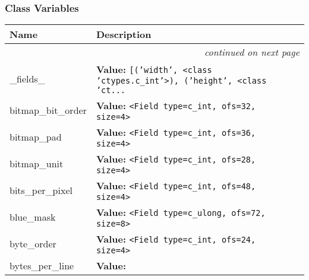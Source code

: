 
  \subsubsection{Class Variables}

    \vspace{-1cm}
\hspace{\varindent}\begin{longtable}{|p{\varnamewidth}|p{\vardescrwidth}|l}
\cline{1-2}
\cline{1-2} \centering \textbf{Name} & \centering \textbf{Description}& \\
\cline{1-2}
\endhead\cline{1-2}\multicolumn{3}{r}{\small\textit{continued on next page}}\\\endfoot\cline{1-2}
\endlastfoot\raggedright \_\-f\-i\-e\-l\-d\-s\-\_\- & \raggedright \textbf{Value:} 
{\tt \texttt{[}\texttt{(}\texttt{'}\texttt{width}\texttt{'}\texttt{, }{\textless}class 'ctypes.c\_int'{\textgreater}\texttt{)}\texttt{, }\texttt{(}\texttt{'}\texttt{height}\texttt{'}\texttt{, }{\textless}class 'ct\texttt{...}}&\\
\cline{1-2}
\raggedright b\-i\-t\-m\-a\-p\-\_\-b\-i\-t\-\_\-o\-r\-d\-e\-r\- & \raggedright \textbf{Value:} 
{\tt {\textless}Field type=c\_int, ofs=32, size=4{\textgreater}}&\\
\cline{1-2}
\raggedright b\-i\-t\-m\-a\-p\-\_\-p\-a\-d\- & \raggedright \textbf{Value:} 
{\tt {\textless}Field type=c\_int, ofs=36, size=4{\textgreater}}&\\
\cline{1-2}
\raggedright b\-i\-t\-m\-a\-p\-\_\-u\-n\-i\-t\- & \raggedright \textbf{Value:} 
{\tt {\textless}Field type=c\_int, ofs=28, size=4{\textgreater}}&\\
\cline{1-2}
\raggedright b\-i\-t\-s\-\_\-p\-e\-r\-\_\-p\-i\-x\-e\-l\- & \raggedright \textbf{Value:} 
{\tt {\textless}Field type=c\_int, ofs=48, size=4{\textgreater}}&\\
\cline{1-2}
\raggedright b\-l\-u\-e\-\_\-m\-a\-s\-k\- & \raggedright \textbf{Value:} 
{\tt {\textless}Field type=c\_ulong, ofs=72, size=8{\textgreater}}&\\
\cline{1-2}
\raggedright b\-y\-t\-e\-\_\-o\-r\-d\-e\-r\- & \raggedright \textbf{Value:} 
{\tt {\textless}Field type=c\_int, ofs=24, size=4{\textgreater}}&\\
\cline{1-2}
\raggedright b\-y\-t\-e\-s\-\_\-p\-e\-r\-\_\-l\-i\-n\-e\- & \raggedright \textbf{Value:} 

\end{longtable}
